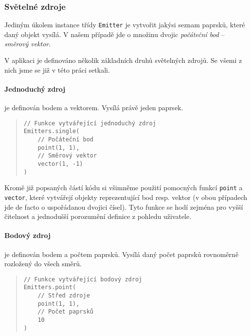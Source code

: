 \subsubsection{Světelné zdroje}

Jediným úkolem instance třídy \texttt{Emitter} je vytvořit jakýsi seznam paprsků, které daný objekt vysílá. V našem případě jde o množinu dvojic \emph{počáteční bod} -- \emph{směrový vektor}.

V aplikaci je definováno několik základních druhů světelných zdrojů. Se všemi z nich jsme se již v této práci setkali.

\paragraph{Jednoduchý zdroj} je definován bodem a vektorem. Vysílá právě jeden paprsek.

\begin{minipage}{\textwidth}\begin{quote}\begin{lstlisting}
// Funkce vytvářející jednoduchý zdroj
Emitters.single(
    // Počáteční bod
    point(1, 1),
    // Směrový vektor
    vector(1, -1)
)
\end{lstlisting}\end{quote}\end{minipage}


Kromě již popsaných částí kódu si všimněme použití pomocných funkcí \texttt{point} a \texttt{vector}, které vytvářejí objekty reprezentující bod resp. vektor (v obou případech jde de facto o uspořádanou dvojici čísel). Tyto funkce se hodí zejména pro vyšší čitelnost a jednodušší porozumění definice z pohledu uživatele.

\paragraph{Bodový zdroj} je definován bodem a počtem paprsků. Vysílá daný počet paprsků rovnoměrně rozložený do všech směrů.

\begin{minipage}{\textwidth}\begin{quote}\begin{lstlisting}
// Funkce vytvářející bodový zdroj
Emitters.point(
    // Střed zdroje
    point(1, 1),
    // Počet paprsků
    10
)
\end{lstlisting}\end{quote}\end{minipage}

